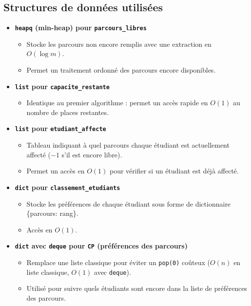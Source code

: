 \documentclass[a4paper,11pt]{article}
\begin{document}
\subsection{Structures de données utilisées}
\begin{itemize}
    \item \textbf{\texttt{heapq} (min-heap) pour \texttt{parcours\_libres}}
    \begin{itemize}
        \item Stocke les parcours non encore remplis avec une extraction en $O(\log m)$.
        \item Permet un traitement ordonné des parcours encore disponibles.
    \end{itemize}
    
    \item \textbf{\texttt{list} pour \texttt{capacite\_restante}}
    \begin{itemize}
        \item Identique au premier algorithme : permet un accès rapide en $O(1)$ au nombre de places restantes.
    \end{itemize}
    
    \item \textbf{\texttt{list} pour \texttt{etudiant\_affecte}}
    \begin{itemize}
        \item Tableau indiquant à quel parcours chaque étudiant est actuellement affecté ($-1$ s’il est encore libre).
        \item Permet un accès en $O(1)$ pour vérifier si un étudiant est déjà affecté.
    \end{itemize}
    
    \item \textbf{\texttt{dict} pour \texttt{classement\_etudiants}}
    \begin{itemize}
        \item Stocke les préférences de chaque étudiant sous forme de dictionnaire \{parcours: rang\}.
        \item Accès en $O(1)$.
    \end{itemize}
    
    \item \textbf{\texttt{dict} avec \texttt{deque} pour \texttt{CP} (préférences des parcours)}
    \begin{itemize}
        \item Remplace une liste classique pour éviter un \texttt{pop(0)} coûteux ($O(n)$ en liste classique, $O(1)$ avec \texttt{deque}).
        \item Utilisé pour suivre quels étudiants sont encore dans la liste de préférences des parcours.
    \end{itemize}
    

\end{itemize}
\end{document}
